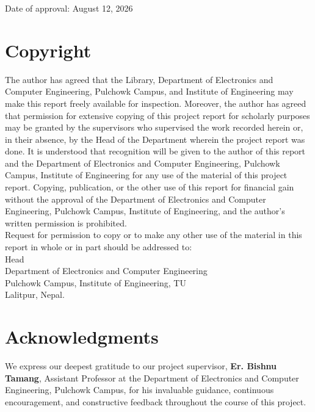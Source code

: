 \documentclass[12pt]{report}
\begin{document}
\newline
\newline
\newline
\centerline{Date of approval: August 12, 2026}

\chapter*{Copyright}
The author has agreed that the Library, Department of Electronics and Computer Engineering, Pulchowk Campus, and Institute of Engineering may make this report freely available for inspection. Moreover, the author has agreed that permission for extensive copying of this project report for scholarly purposes may be granted by the supervisors who supervised the work recorded herein or, in their absence, by the Head of the Department wherein the project report was done. It is understood that recognition will be given to the author of this report and the Department of Electronics and Computer Engineering, Pulchowk Campus, Institute of Engineering for any use of the material of this project report. Copying, publication, or the other use of this report for financial gain without the approval of the Department of Electronics and Computer Engineering, Pulchowk Campus, Institute of Engineering, and the author's written permission is prohibited.\\

Request for permission to copy or to make any other use of the material in this report in whole or in part should be addressed to:\\
\newline
Head\\
Department of Electronics and Computer Engineering\\
Pulchowk Campus, Institute of Engineering, TU\\
Lalitpur, Nepal.

\chapter*{Acknowledgments}
We express our deepest gratitude to our project supervisor, \textbf{Er. Bishnu Tamang}, Assistant Professor at the Department of Electronics and Computer Engineering, Pulchowk Campus, for his invaluable guidance, continuous encouragement, and constructive feedback throughout the course of this project.
\end{document}
